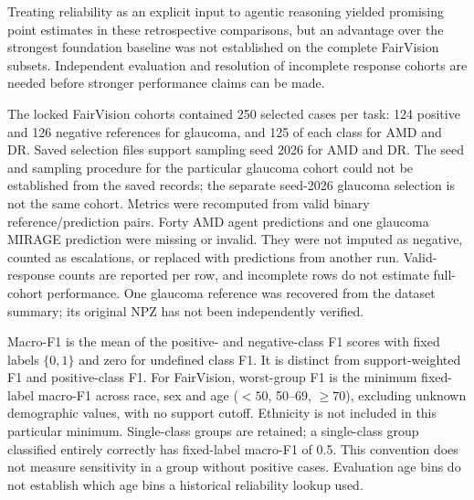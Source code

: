 Treating reliability as an explicit input to agentic reasoning yielded
promising point estimates in these retrospective comparisons, but an advantage
over the strongest foundation baseline was not established on the complete
FairVision subsets. Independent evaluation and resolution of incomplete
response cohorts are needed before stronger performance claims can be made.

The locked FairVision cohorts contained 250 selected cases per task:
124 positive and 126 negative references for glaucoma, and 125 of each
class for AMD and DR. Saved selection files support sampling seed 2026
for AMD and DR. The seed and sampling procedure for the particular glaucoma
cohort could not be established from the saved records; the separate
seed-2026 glaucoma selection is not the same cohort.
Metrics were recomputed from valid binary reference/prediction pairs.
Forty AMD agent predictions and one glaucoma MIRAGE prediction were missing
or invalid. They were not imputed as negative, counted as escalations,
or replaced with predictions from another run. Valid-response counts are
reported per row, and incomplete rows do not estimate full-cohort performance.
One glaucoma reference was recovered from the dataset summary; its original
NPZ has not been independently verified.

Macro-F1 is the mean of the positive- and negative-class F1 scores with
fixed labels $\{0,1\}$ and zero for undefined class F1. It is distinct from
support-weighted F1 and positive-class F1. For FairVision, worst-group F1
is the minimum fixed-label macro-F1 across race, sex and age ($<50$, 50--69,
$\geq70$), excluding unknown demographic values, with no support cutoff.
Ethnicity is not included in this particular minimum. Single-class groups
are retained; a single-class group classified entirely correctly has
fixed-label macro-F1 of 0.5. This convention does not measure sensitivity
in a group without positive cases. Evaluation age bins do not establish
which age bins a historical reliability lookup used.

